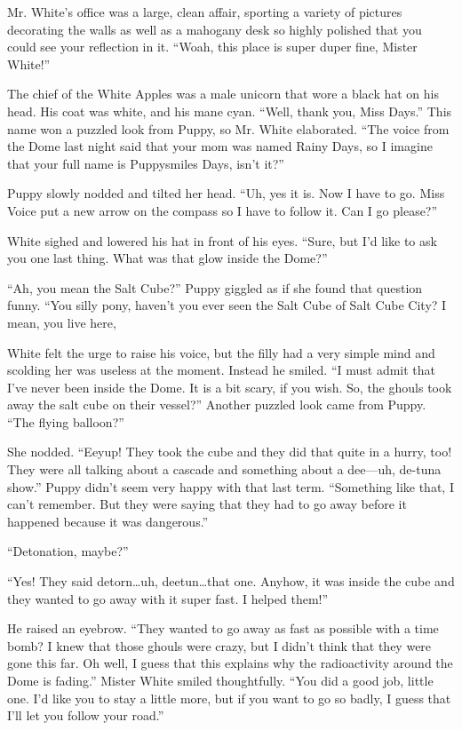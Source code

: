 Mr. White's office was a large, clean affair, sporting a variety of pictures decorating the walls as well as a mahogany desk so highly polished that you could see your reflection in it. ``Woah, this place is super duper fine, Mister White!''

The chief of the White Apples was a male unicorn that wore a black hat on his head. His coat was white, and his mane cyan. ``Well, thank you, Miss Days.'' This name won a puzzled look from Puppy, so Mr. White elaborated. ``The voice from the Dome last night said that your mom was named Rainy Days, so I imagine that your full name is Puppysmiles Days, isn't it?''

Puppy slowly nodded and tilted her head. ``Uh, yes it is. Now I have to go. Miss Voice put a new arrow on the compass so I have to follow it. Can I go please?''

White sighed and lowered his hat in front of his eyes. ``Sure, but I'd like to ask you one last thing. What was that glow inside the Dome?''

``Ah, you mean the Salt Cube?'' Puppy giggled as if she found that question funny. ``You silly pony, haven't you ever seen the Salt Cube of Salt Cube City? I mean, you live here, 

White felt the urge to raise his voice, but the filly had a very simple mind and scolding her was useless at the moment. Instead he smiled. ``I must admit that I've never been inside the Dome. It is a bit scary, if you wish. So, the ghouls took away the salt cube on their vessel?'' Another puzzled look came from Puppy. ``The flying balloon?''

She nodded. ``Eeyup! They took the cube and they did that quite in a hurry, too! They were all talking about a cascade and something about a dee---uh, de-tuna show.'' Puppy didn't seem very happy with that last term. ``Something like that, I can't remember. But they were saying that they had to go away before it happened because it was dangerous.''

``Detonation, maybe?''

``Yes! They said detorn\dots uh, deetun\dots that one. Anyhow, it was inside the cube and they wanted to go away with it super fast. I helped them!''

He raised an eyebrow. ``They wanted to go away as fast as possible with a time bomb? I knew that those ghouls were crazy, but I didn't think that they were gone this far. Oh well, I guess that this explains why the radioactivity around the Dome is fading.'' Mister White smiled thoughtfully. ``You did a good job, little one. I'd like you to stay a little more, but if you want to go so badly, I guess that I'll let you follow your road.''

